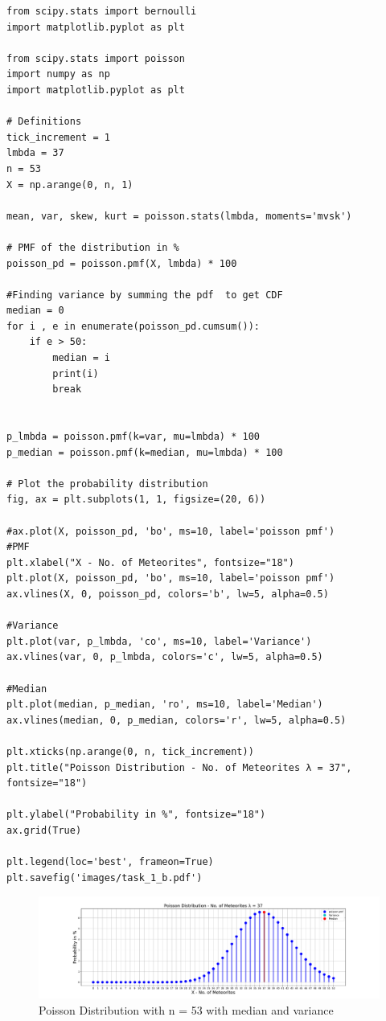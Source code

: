 \begin{lstlisting}[caption={Plotting the PMF for Poisson Distribution)},label={lst:code_task_1_b}]
from scipy.stats import bernoulli
import matplotlib.pyplot as plt

from scipy.stats import poisson
import numpy as np
import matplotlib.pyplot as plt

# Definitions
tick_increment = 1
lmbda = 37
n = 53
X = np.arange(0, n, 1)

mean, var, skew, kurt = poisson.stats(lmbda, moments='mvsk')

# PMF of the distribution in %
poisson_pd = poisson.pmf(X, lmbda) * 100

#Finding variance by summing the pdf  to get CDF
median = 0
for i , e in enumerate(poisson_pd.cumsum()):
    if e > 50:
        median = i
        print(i)
        break


p_lmbda = poisson.pmf(k=var, mu=lmbda) * 100
p_median = poisson.pmf(k=median, mu=lmbda) * 100

# Plot the probability distribution
fig, ax = plt.subplots(1, 1, figsize=(20, 6))

#ax.plot(X, poisson_pd, 'bo', ms=10, label='poisson pmf')
#PMF
plt.xlabel("X - No. of Meteorites", fontsize="18")
plt.plot(X, poisson_pd, 'bo', ms=10, label='poisson pmf')
ax.vlines(X, 0, poisson_pd, colors='b', lw=5, alpha=0.5)

#Variance
plt.plot(var, p_lmbda, 'co', ms=10, label='Variance')
ax.vlines(var, 0, p_lmbda, colors='c', lw=5, alpha=0.5)

#Median
plt.plot(median, p_median, 'ro', ms=10, label='Median')
ax.vlines(median, 0, p_median, colors='r', lw=5, alpha=0.5)

plt.xticks(np.arange(0, n, tick_increment))
plt.title("Poisson Distribution - No. of Meteorites λ = 37", fontsize="18")

plt.ylabel("Probability in %", fontsize="18")
ax.grid(True)

plt.legend(loc='best', frameon=True)
plt.savefig('images/task_1_b.pdf')

\end{lstlisting}

\begin{figure}[h!]
\centering
\includegraphics[width=\textwidth]{pics/task_1_b.pdf}
\caption{Poisson Distribution with n = 53 with median and variance}\label{fig:task_1_b}
\end{figure}
\FloatBarrier

